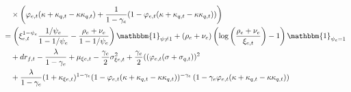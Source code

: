 \documentclass[12 pt, oneside]{article}
\theoremstyle{definition}
\theoremstyle{definition}
\theoremstyle{definition}
\begin{document}
\begin{align*}
    &\quad \times\left(\varphi_{e, t}(\kappa + \kappa_{q, t} - \kappa\kappa_{q, t}) + \frac{1}{1 - \gamma_e}(1 - \varphi_{e, t}(\kappa + \kappa_{q, t} - \kappa\kappa_{q, t}))  \right)\\
    & = \left(\xi_{e, t}^{1 - \psi_e}\frac{1 / \psi_e}{1 - 1/\psi_e}  - \frac{\rho_e + \nu_e}{1 - 1 / \psi_e} \right)\mathbbm{1}_{\psi\neq 1} + (\rho_e + \nu_e)\left(\log\left(\frac{\rho_e + \nu_e}{\xi_{e, t}}\right) - 1\right)\mathbbm{1}_{\psi_e = 1}\\
    &\quad + dr_{f, t} - \frac{\lambda}{1 - \gamma_e} + \mu_{\xi e, t} - \frac{\gamma_e}{2}\sigma_{\xi e, t}^2 +\frac{\gamma_e}{2}((\varphi_{e, t}(\sigma + \sigma_{q, t}))^2\\
    &\quad + \frac{\lambda}{1 - \gamma_e}(1 + \kappa_{\xi e, t})^{1 - \gamma_e}(1 - \varphi_{e, t}(\kappa + \kappa_{q, t} - \kappa \kappa_{q, t}))^{ - \gamma_e}\left(1 - \gamma_e\varphi_{e, t}(\kappa + \kappa_{q, t} - \kappa\kappa_{q, t})\right)
\end{align*}
\end{document}
